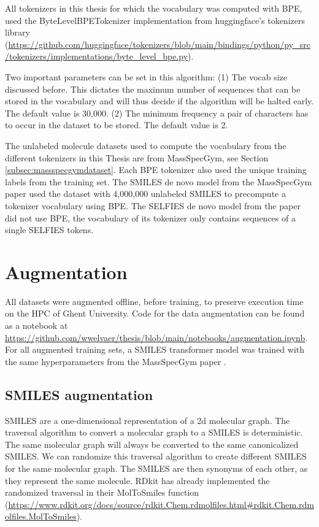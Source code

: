 All tokenizers in this thesis for which the vocabulary was computed with \acf{BPE}, used the ByteLevelBPETokenizer implementation from huggingface's tokenizers library (\url{https://github.com/huggingface/tokenizers/blob/main/bindings/python/py_src/tokenizers/implementations/byte_level_bpe.py}).

Two important parameters can be set in this algorithm:
(1) The vocab size discussed before. This dictates the maximum number of sequences that can be stored in the vocabulary and will thus decide if the algorithm will be halted early. The default value is 30,000.
(2) The minimum frequency a pair of characters has to occur in the dataset to be stored. The default value is 2.

The unlabeled molecule datasets used to compute the vocabulary from the different tokenizers in this Thesis are from MassSpecGym, see Section \ref{subsec:massspecgymdataset}.
Each \ac{BPE} tokenizer also used the unique training labels from the training set.
The SMILES de novo model from the MassSpecGym paper \cite{bushuiev2024massspecgym} used the dataset with 4,000,000 unlabeled SMILES to precompute a tokenizer vocabulary using \ac{BPE}.
The SELFIES de novo model from the paper did not use \ac{BPE}, the vocabulary of its tokenizer only contains sequences of a single SELFIES tokens.

\section{Augmentation}
\label{sec:augmentation}

All datasets were augmented offline, before training, to preserve execution time on the \ac{HPC} of Ghent University.
Code for the data augmentation can be found as a notebook at \url{https://github.com/wwelvaer/thesis/blob/main/notebooks/augmentation.ipynb}.
For all augmented training sets, a SMILES transformer model was trained with the same hyperparameters from the MassSpecGym paper \cite{bushuiev2024massspecgym}.

\subsection{SMILES augmentation}

SMILES are a one-dimensional representation of a 2d molecular graph.
The traversal algorithm to convert a molecular graph to a SMILES is deterministic.
The same molecular graph will always be converted to the same canonicalized SMILES.
We can randomize this traversal algorithm to create different SMILES for the same molecular graph.
The SMILES are then synonyms of each other, as they represent the same molecule.
RDkit has already implemented the randomized traversal in their MolToSmiles function (\url{https://www.rdkit.org/docs/source/rdkit.Chem.rdmolfiles.html#rdkit.Chem.rdmolfiles.MolToSmiles}).

